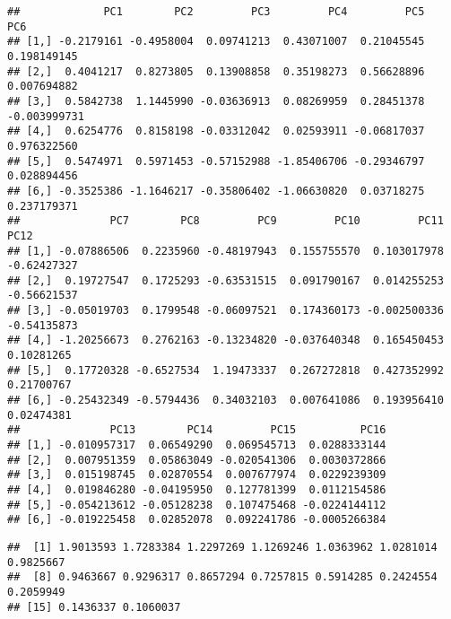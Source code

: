 \documentclass[
]{article}
\newenvironment{Shaded}{\begin{snugshade}}{\end{snugshade}}
\newcommand{\DocumentationTok}[1]{\textcolor[rgb]{0.56,0.35,0.01}{\textbf{\textit{#1}}}}
\newcommand{\NormalTok}[1]{#1}
\newcommand{\SpecialCharTok}[1]{\textcolor[rgb]{0.81,0.36,0.00}{\textbf{#1}}}
\begin{document}
\begin{verbatim}
##             PC1        PC2         PC3         PC4         PC5          PC6
## [1,] -0.2179161 -0.4958004  0.09741213  0.43071007  0.21045545  0.198149145
## [2,]  0.4041217  0.8273805  0.13908858  0.35198273  0.56628896  0.007694882
## [3,]  0.5842738  1.1445990 -0.03636913  0.08269959  0.28451378 -0.003999731
## [4,]  0.6254776  0.8158198 -0.03312042  0.02593911 -0.06817037  0.976322560
## [5,]  0.5474971  0.5971453 -0.57152988 -1.85406706 -0.29346797  0.028894456
## [6,] -0.3525386 -1.1646217 -0.35806402 -1.06630820  0.03718275  0.237179371
##              PC7        PC8         PC9         PC10         PC11        PC12
## [1,] -0.07886506  0.2235960 -0.48197943  0.155755570  0.103017978 -0.62427327
## [2,]  0.19727547  0.1725293 -0.63531515  0.091790167  0.014255253 -0.56621537
## [3,] -0.05019703  0.1799548 -0.06097521  0.174360173 -0.002500336 -0.54135873
## [4,] -1.20256673  0.2762163 -0.13234820 -0.037640348  0.165450453  0.10281265
## [5,]  0.17720328 -0.6527534  1.19473337  0.267272818  0.427352992  0.21700767
## [6,] -0.25432349 -0.5794436  0.34032103  0.007641086  0.193956410  0.02474381
##              PC13        PC14         PC15          PC16
## [1,] -0.010957317  0.06549290  0.069545713  0.0288333144
## [2,]  0.007951359  0.05863049 -0.020541306  0.0030372866
## [3,]  0.015198745  0.02870554  0.007677974  0.0229239309
## [4,]  0.019846280 -0.04195950  0.127781399  0.0112154586
## [5,] -0.054213612 -0.05128238  0.107475468 -0.0224144112
## [6,] -0.019225458  0.02852078  0.092241786 -0.0005266384
\end{verbatim}

\begin{Shaded}
\end{Shaded}

\begin{verbatim}
##  [1] 1.9013593 1.7283384 1.2297269 1.1269246 1.0363962 1.0281014 0.9825667
##  [8] 0.9463667 0.9296317 0.8657294 0.7257815 0.5914285 0.2424554 0.2059949
## [15] 0.1436337 0.1060037
\end{verbatim}
\end{document}
